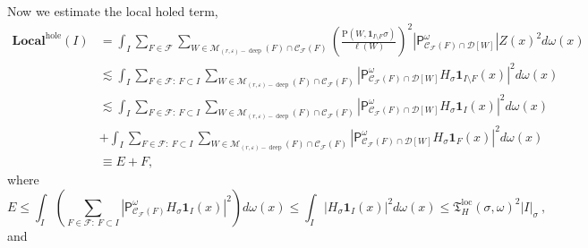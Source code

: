 \documentclass{amsart}%
\theoremstyle{plain}
\numberwithin{equation}{section}
\begin{document}
Now we estimate the local holed term,%
\begin{align*}
\mathbf{Local}^{\operatorname{hole}}\left(  I\right)    & =\int_{I}\sum
_{F\in\mathcal{F}}\sum_{W\in\mathcal{M}_{\left(  r,\varepsilon\right)
-\operatorname*{deep}}\left(  F\right)  \cap\mathcal{C}_{\mathcal{F}}\left(
F\right)  }\left(  \frac{\mathrm{P}\left(  W,\mathbf{1}_{I\setminus F}%
\sigma\right)  }{\ell\left(  W\right)  }\right)  ^{2}\left\vert \mathsf{P}%
_{\mathcal{C}_{\mathcal{F}}\left(  F\right)  \cap\mathcal{D}\left[  W\right]
}^{\omega}\right\vert Z\left(  x\right)  ^{2}d\omega\left(  x\right)  \\
& \lesssim\int_{I}\sum_{F\in\mathcal{F}:\ F\subset I}\sum_{W\in\mathcal{M}%
_{\left(  r,\varepsilon\right)  -\operatorname*{deep}}\left(  F\right)
\cap\mathcal{C}_{\mathcal{F}}\left(  F\right)  }\left\vert \mathsf{P}%
_{\mathcal{C}_{\mathcal{F}}\left(  F\right)  \cap\mathcal{D}\left[  W\right]
}^{\omega}H_{\sigma}\mathbf{1}_{I\setminus F}\left(  x\right)  \right\vert
^{2}d\omega\left(  x\right)  \\
& \lesssim\int_{I}\sum_{F\in\mathcal{F}:\ F\subset I}\sum_{W\in\mathcal{M}%
_{\left(  r,\varepsilon\right)  -\operatorname*{deep}}\left(  F\right)
\cap\mathcal{C}_{\mathcal{F}}\left(  F\right)  }\left\vert \mathsf{P}%
_{\mathcal{C}_{\mathcal{F}}\left(  F\right)  \cap\mathcal{D}\left[  W\right]
}^{\omega}H_{\sigma}\mathbf{1}_{I}\left(  x\right)  \right\vert ^{2}%
d\omega\left(  x\right)  \\
& +\int_{I}\sum_{F\in\mathcal{F}:\ F\subset I}\sum_{W\in\mathcal{M}_{\left(
r,\varepsilon\right)  -\operatorname*{deep}}\left(  F\right)  \cap
\mathcal{C}_{\mathcal{F}}\left(  F\right)  }\left\vert \mathsf{P}%
_{\mathcal{C}_{\mathcal{F}}\left(  F\right)  \cap\mathcal{D}\left[  W\right]
}^{\omega}H_{\sigma}\mathbf{1}_{F}\left(  x\right)  \right\vert ^{2}%
d\omega\left(  x\right)  \\
& \equiv E+F,
\end{align*}
where%
\[
E\leq\int_{I}\left(  \sum_{F\in\mathcal{F}:\ F\subset I}\left\vert
\mathsf{P}_{\mathcal{C}_{\mathcal{F}}\left(  F\right)  }^{\omega}H_{\sigma
}\mathbf{1}_{I}\left(  x\right)  \right\vert ^{2}\right)  d\omega\left(
x\right)  \leq\int_{I}\left\vert H_{\sigma}\mathbf{1}_{I}\left(  x\right)
\right\vert ^{2}d\omega\left(  x\right)  \leq\mathfrak{T}_{H}%
^{\operatorname{loc}}\left(  \sigma,\omega\right)  ^{2}\left\vert I\right\vert
_{\sigma}\ ,
\]
and%
\end{document}
